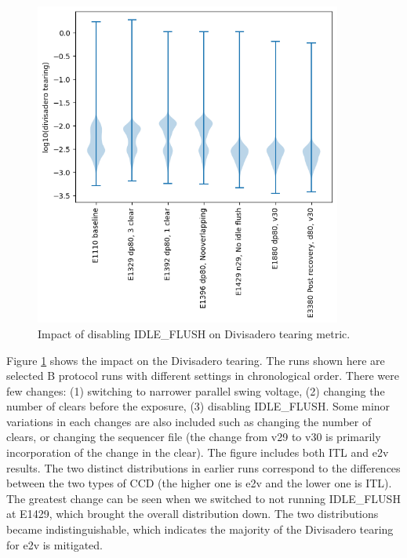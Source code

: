 \begin{figure}[ht]
\begin{centering}
\includegraphics[width=0.9\textwidth]{figures/divisadero.png}
\end{centering}
\caption{Impact of disabling IDLE\_FLUSH on Divisadero tearing metric.}\label{IdleFlushEffect:divisadero}
\end{figure}
Figure \ref{IdleFlushEffect:divisadero} shows the impact on the Divisadero tearing. The runs shown here are selected B protocol runs with different settings in chronological order. There were few changes: (1) switching to narrower parallel swing voltage, (2) changing the number of clears before the exposure, (3) disabling IDLE\_FLUSH.  Some minor variations in each changes are also included such as changing the number of clears, or changing the sequencer file (the change from v29 to v30  is primarily incorporation of the change in the clear). The figure includes both ITL and e2v results. The two distinct distributions in earlier runs correspond to the differences between the two types of CCD (the higher one is e2v and the lower one is ITL). The greatest change can be seen when we switched to not running IDLE\_FLUSH at E1429, which brought the overall distribution down. The two distributions became indistinguishable, which indicates the majority of the Divisadero tearing for e2v is mitigated.

